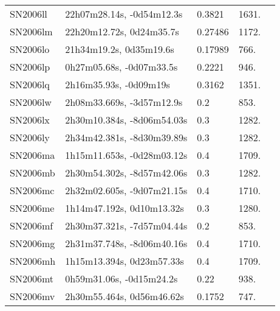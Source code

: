 \begin{longtable}{lllll}
         SN2006ll &      22h07m28.14s, -0d54m12.3s &   0.3821 &          1631. &    \citet{2011ApJ...740...92G} \\
         SN2006lm &       22h20m12.72s, 0d24m35.7s &  0.27486 &          1172. &    \citet{2016SDSSD.C...0000:} \\
         SN2006lo &        21h34m19.2s, 0d35m19.6s &  0.17989 &           766. &    \citet{2016SDSSD.C...0000:} \\
         SN2006lp &       0h27m05.68s, -0d07m33.5s &   0.2221 &           946. &    \citet{2011ApJ...740...92G} \\
         SN2006lq &         2h16m35.93s, -0d09m19s &   0.3162 &          1351. &    \citet{2011ApJ...740...92G} \\
         SN2006lw &      2h08m33.669s, -3d57m12.9s &      0.2 &           853. &    \citet{2006CBET..717A...1P} \\
         SN2006lx &     2h30m10.384s, -8d06m54.03s &      0.3 &          1282. &    \citet{2006CBET..717A...1P} \\
         SN2006ly &     2h34m42.381s, -8d30m39.89s &      0.3 &          1282. &    \citet{2006CBET..717A...1P} \\
         SN2006ma &     1h15m11.653s, -0d28m03.12s &      0.4 &          1709. &    \citet{2006CBET..717A...1P} \\
         SN2006mb &     2h30m54.302s, -8d57m42.06s &      0.3 &          1282. &    \citet{2006CBET..717A...1P} \\
         SN2006mc &     2h32m02.605s, -9d07m21.15s &      0.4 &          1710. &    \citet{2006CBET..717A...1P} \\
         SN2006me &      1h14m47.192s, 0d10m13.32s &      0.3 &          1280. &    \citet{2006CBET..717A...1P} \\
         SN2006mf &     2h30m37.321s, -7d57m04.44s &      0.2 &           853. &    \citet{2006CBET..717A...1P} \\
         SN2006mg &     2h31m37.748s, -8d06m40.16s &      0.4 &          1710. &    \citet{2006CBET..717A...1P} \\
         SN2006mh &      1h15m13.394s, 0d23m57.33s &      0.4 &          1709. &    \citet{2006CBET..717A...1P} \\
         SN2006mt &       0h59m31.06s, -0d15m24.2s &     0.22 &           938. &    \citet{2006CBET..726A...1B} \\
         SN2006mv &      2h30m55.464s, 0d56m46.62s &   0.1752 &           747. &    \citet{2011ApJ...740...92G} \\

\end{longtable}
